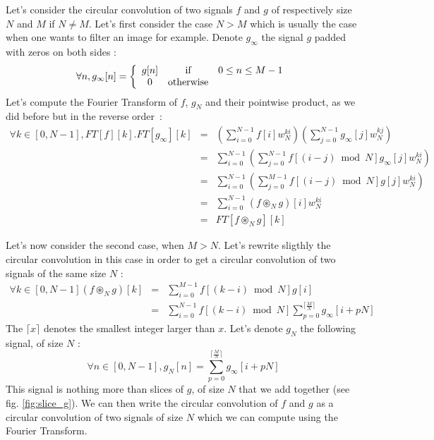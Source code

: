 \documentclass[a4paper,10pt,twoside]{article}
\begin{document}
Let's consider the circular convolution of two signals $f$ and $g$ of respectively size $N$ and $M$ if $N \neq M$. Let's first consider the case $N > M$ which is usually the case when one wants to filter an image for example. Denote $g_\infty$ the signal $g$ padded with zeros on both sides :
\begin{equation}
\forall n, g_\infty[n] = \left\lbrace
\begin{array}{ccc}
g[n]     & \mbox{if} & 0 \leq n \leq M-1\\
0  & \mbox{otherwise}\\
\end{array}\right. \\
\end{equation}
Let's compute the Fourier Transform of $f$, $g_N$ and their pointwise product, as we did before but in the reverse order~:
\begin{eqnarray}
\forall k \in [0,N-1], FT[f][k].FT[g_\infty][k] &=& \left(\sum_{i=0}^{N-1} f[i] w_N^{ki}\right) \left( \sum_{j=0}^{N-1} g_\infty[j] w_N^{kj}\right)\\
                                           &=& \sum_{i=0}^{N-1} \left( \sum_{j=0}^{N-1} f[(i-j) \bmod N] g_\infty[j] w_N^{ki} \right)\\
				           &=& \sum_{i=0}^{N-1} \left( \sum_{j=0}^{M-1} f[(i-j) \bmod N] g[j] w_N^{ki} \right)\\
					   &=& \sum_{i=0}^{N-1} (f \circledast_N g)[i] w_N^{ki} \\
					   &=& FT[f \circledast_N g][k]
\end{eqnarray}

Let's now consider the second case, when $M > N$. Let's rewrite sligthly the circular convolution in this case in order to get a circular convolution of two signals of the same size $N$ :
\begin{eqnarray}
\forall k \in [0,N-1] (f \circledast_N g)[k] &=& \sum_{i=0}^{M-1} f[(k-i) \bmod N] g[i]\\
                                             &=& \sum_{i=0}^{N-1} f[(k-i) \bmod N] \sum_{p=0}^{\lceil \frac{M}{N}\rceil} g_\infty[i + pN]
\end{eqnarray}
The $\lceil x \rceil$ denotes the smallest integer larger than $x$. Let's denote $g_N$ the following signal, of size $N$ :
\begin{equation}
\forall n \in [0,N-1], g_N[n] = \sum_{p=0}^{\lceil \frac{M}{N}\rceil} g_\infty[i + pN]
\end{equation}
This signal is nothing more than slices of $g$, of size $N$ that we add together (see fig. \ref{fig:slice_g}). We can then write the circular convolution of $f$ and $g$ as a circular convolution of two signals of size $N$ which we can compute using the Fourier Transform.
\end{document}

